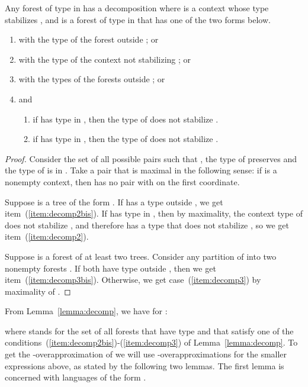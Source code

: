 \documentclass{LMCS}
\begin{document}
\begin{lem}\label{lemma:decomp}
  Any forest  of type in  has a decomposition   where  is a context whose type stabilizes , and   is a forest of type   in   that has one of the two forms below.
  \begin{enumerate}[\em(1)]
\item\label{item:decomp2bis}  with  the type of the forest  outside ; or
	\item\label{item:decomp2}  with  the type of the context  not stabilizing
	    ; or
	\item\label{item:decomp3bis}  with the types of the forests  outside ; or
\item\label{item:decomp3}   and \begin{enumerate}[]
	\item if  has  type in , then the type of   does not stabilize .
		\item if  has  type in , then the type of   does not stabilize .
\end{enumerate}
  \end{enumerate}
\end{lem}
\begin{proof}
Consider the set  of all possible pairs  such that , the type of  preserves  and the type of  is in .  Take a pair  that is maximal in the following sense: if  is a nonempty context, then  has no pair with  on the first coordinate. 


Suppose  is a tree of the form .  If  has a type outside
, we get item~(\ref{item:decomp2bis}). If  has type in
, then by maximality, the context type of  does not stabilize ,
and therefore  has a type that does not stabilize , so we get
item~(\ref{item:decomp2}).

Suppose    is a forest of at least two trees.
Consider any partition of  into two nonempty forests .
If both   have type outside , then we get item~(\ref{item:decomp3bis}). Otherwise, we get case~(\ref{item:decomp3}) by maximality of .
\end{proof}


From Lemma~\ref{lemma:decomp}, we have for :

where  stands for the set of all forests  that have type  and that
satisfy one of the conditions~(\ref{item:decomp2bis})-(\ref{item:decomp3}) of
Lemma~\ref{lemma:decomp}.
To get the -overapproximation of  we will use
-overapproximations for the smaller expressions above, as stated by the
following two lemmas. The first lemma is concerned with languages of the form .
\end{document}
